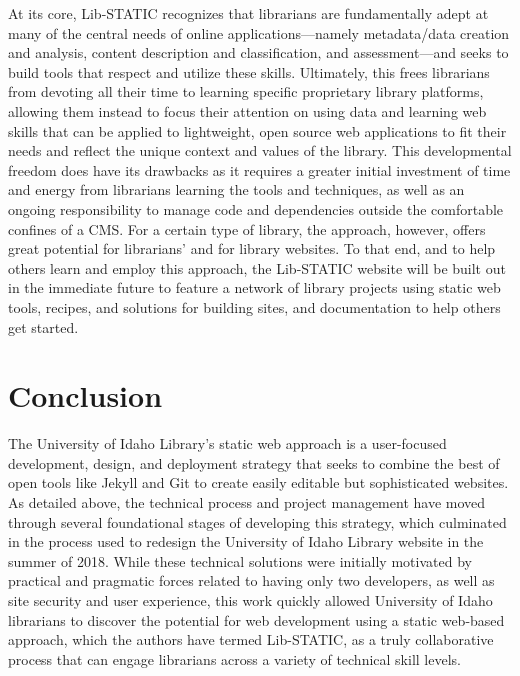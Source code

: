 \documentclass{book}
\begin{document}
At its core, Lib-STATIC recognizes that librarians are fundamentally adept at
many of the central needs of online applications---namely metadata/data
creation and analysis, content description and classification, and
assessment---and seeks to build tools that respect and utilize these skills.
Ultimately, this frees librarians from devoting all their time to learning
specific proprietary library platforms, allowing them instead to focus their
attention on using data and learning web skills that can be applied to
lightweight, open source web applications to fit their needs and reflect the
unique context and values of the library. This developmental freedom does have
its drawbacks as it requires a greater initial investment of time and energy
from librarians learning the tools and techniques, as well as an ongoing
responsibility to manage code and dependencies outside the comfortable
confines of a CMS. For a certain type of library, the approach, however,
offers great potential for librarians' and for library websites. To that end,
and to help others learn and employ this approach, the Lib-STATIC website will
be built out in the immediate future to feature a network of library projects
using static web tools, recipes, and solutions for building sites, and
documentation to help others get started.

\hypertarget{conclusion}{%
\chapter{Conclusion}\label{conclusion}}

The University of Idaho Library's static web approach is a user-focused
development, design, and deployment strategy that seeks to combine the best of
open tools like Jekyll and Git to create easily editable but sophisticated
websites. As detailed above, the technical process and project management have
moved through several foundational stages of developing this strategy, which
culminated in the process used to redesign the University of Idaho Library
website in the summer of 2018. While these technical solutions were initially
motivated by practical and pragmatic forces related to having only two
developers, as well as site security and user experience, this work quickly
allowed University of Idaho librarians to discover the potential for web
development using a static web-based approach, which the authors have termed
Lib-STATIC, as a truly collaborative process that can engage librarians across
a variety of technical skill levels.
\end{document}
